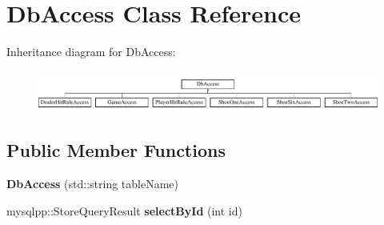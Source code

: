 \hypertarget{classDbAccess}{
\section{\-Db\-Access \-Class \-Reference}
\label{d4/dda/classDbAccess}
}
\-Inheritance diagram for \-Db\-Access\-:\begin{figure}[H]
\begin{center}
\leavevmode
\includegraphics[height=1.333333cm]{d4/dda/classDbAccess}
\end{center}
\end{figure}
\subsection*{\-Public \-Member \-Functions}
\begin{DoxyCompactItemize}
\item 
\hypertarget{classDbAccess_a97dec76caf946793ab4aaac95fe4dbfb}{
{\bfseries \-Db\-Access} (std\-::string table\-Name)}
\label{d4/dda/classDbAccess_a97dec76caf946793ab4aaac95fe4dbfb}

\item 
\hypertarget{classDbAccess_aebb66b3c7c7a6416fdf6d23ca044dafe}{
mysqlpp\-::\-Store\-Query\-Result {\bfseries select\-By\-Id} (int id)}
\label{d4/dda/classDbAccess_aebb66b3c7c7a6416fdf6d23ca044dafe}

\end{DoxyCompactItemize}
